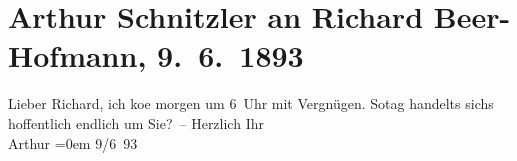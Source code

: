 

         
         \renewcommand{\erwaehntePersonen}{Personen: Richard Beer-Hofmann}
         \renewcommand{\erwaehnteOrte}{Orte: Wien}
         \renewcommand{\erwaehnteWerke}{}
               \section[Arthur Schnitzler an Richard Beer-Hofmann, 9. 6. 1893]{ Arthur Schnitzler an Richard Beer-Hofmann, 9. 6. 1893}\nopagebreak{}\rehead{ }\begin{ledgroupsized}[t]{13cm}\normalsize\beginnumbering \toendnotes[C]{\smallbreak\pagebreak[2]} 
\pstart
           \noindent{}{\pb}Lieber Richard, ich ko{\geminationm}e morgen um 6 Uhr mit Vergnügen.
                     So{\geminationn}tag handelts sichs hoffentlich
               endlich um Sie? –\pend
           \pstart
           Herzlich Ihr{\\[\baselineskip]}\spacefill\mbox{Arthur}\pend
           \leftskip=0em{}\pstart
           \raggedleft{}9/6 93\pend
           
         
         \endnumbering{}\end{ledgroupsized}  \newcommand{\dateiname}{L00219}\newcommand{\titel}{Arthur Schnitzler an Richard Beer-Hofmann, 9. 6. 1893}\newcommand{\editorInnen}{Martin Anton Müller und Gerd-Hermann Susen}
      